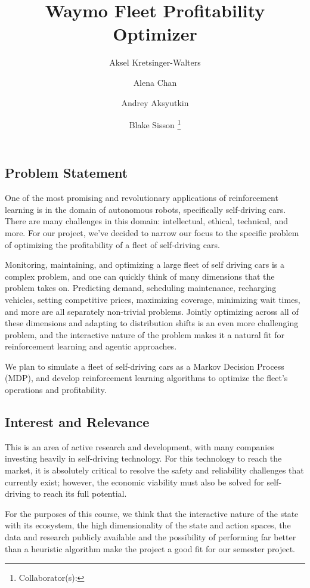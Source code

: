 \documentclass[12pt]{article}
\title{Waymo Fleet Profitability Optimizer}
\author{
		Aksel Kretsinger-Walters \and
		Alena Chan \and
		Andrey Aksyutkin \and
		Blake Sisson \footnote{Collaborator(s): \collaborators}
}
\date{}
\begin{document}
\maketitle

\subsection*{Problem Statement}
One of the most promising and revolutionary applications of reinforcement learning is in
the domain of autonomous robots, specifically self-driving cars. There are many challenges
in this domain: intellectual, ethical, technical, and more. For our project, we've decided
to narrow our focus to the specific problem of optimizing the profitability of a fleet of
self-driving cars.

Monitoring, maintaining, and optimizing a large fleet of self driving cars is a complex
problem, and one can quickly think of many dimensions that the problem takes on.
Predicting demand, scheduling maintenance, recharging vehicles, setting competitive
prices, maximizing coverage, minimizing wait times, and more are all separately non-trivial
problems. Jointly optimizing across all of these dimensions and adapting to distribution shifts
is an even more challenging problem, and the interactive nature of the problem makes it a natural
fit for reinforcement learning and agentic approaches.

We plan to simulate a fleet of self-driving cars as a Markov Decision Process (MDP), and
develop reinforcement learning algorithms to optimize the fleet's operations and profitability.

\subsection*{Interest and Relevance}
This is an area of active research and development, with many companies investing heavily in
self-driving technology. For this technology to reach the market, it is absolutely
critical to resolve the safety and reliability challenges that currently exist; however, the
economic viability must also be solved for self-driving to reach its full potential.

For the purposes of this course, we think that the interactive nature of the state with its
ecosystem, the high dimensionality of the state and action spaces, the data and research publicly
available and the possibility of performing far better than a heuristic algorithm make the
project a good fit for our semester project.
\end{document}
